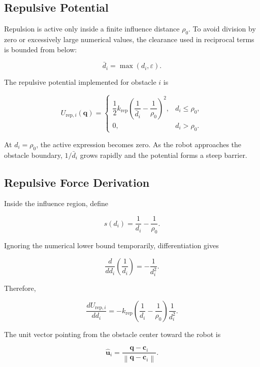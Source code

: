 \documentclass[10pt,twocolumn,a4paper]{article}
\begin{document}
\subsection{Repulsive Potential}

Repulsion is active only inside a finite influence distance $\rho_0$. To
avoid division by zero or excessively large numerical values, the clearance
used in reciprocal terms is bounded from below:

\begin{equation}
    \bar d_i
    =
    \max(d_i,\varepsilon).
    \label{eq:safe_distance}
\end{equation}

The repulsive potential implemented for obstacle $i$ is

\begin{equation}
U_{\mathrm{rep},i}(\mathbf{q})
=
\begin{cases}
\dfrac{1}{2}k_{\mathrm{rep}}
\left(
\dfrac{1}{\bar d_i}
-
\dfrac{1}{\rho_0}
\right)^2,
& d_i\leq\rho_0,\\[3mm]
0,
& d_i>\rho_0.
\end{cases}
\label{eq:repulsive_potential}
\end{equation}

At $d_i=\rho_0$, the active expression becomes zero. As the robot
approaches the obstacle boundary, $1/\bar d_i$ grows rapidly and the
potential forms a steep barrier.

\subsection{Repulsive Force Derivation}

Inside the influence region, define

\[
    s(d_i)
    =
    \frac{1}{d_i}-\frac{1}{\rho_0}.
\]

Ignoring the numerical lower bound temporarily, differentiation gives

\[
    \frac{d}{d d_i}\left(\frac{1}{d_i}\right)
    =
    -\frac{1}{d_i^2}.
\]

Therefore,

\[
    \frac{dU_{\mathrm{rep},i}}{d d_i}
    =
    -k_{\mathrm{rep}}
    \left(
    \frac{1}{d_i}-\frac{1}{\rho_0}
    \right)
    \frac{1}{d_i^2}.
\]

The unit vector pointing from the obstacle center toward the robot is

\begin{equation}
    \hat{\mathbf{u}}_i
    =
    \frac{\mathbf{q}-\mathbf{c}_i}
    {\left\|\mathbf{q}-\mathbf{c}_i\right\|}.
    \label{eq:repulsive_direction}
\end{equation}
\end{document}
